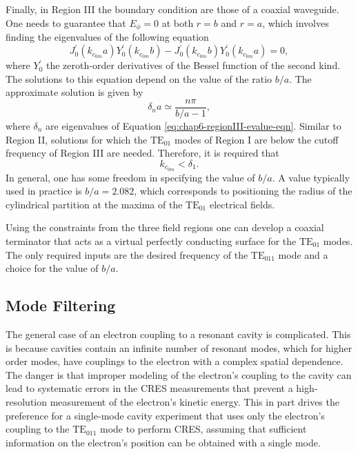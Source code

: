 Finally, in Region III the boundary condition are those of a coaxial waveguide. One needs to guarantee that $E_\phi = 0$ at both $r=b$ and $r=a$, which involves finding the eigenvalues of the following equation
\begin{equation}
    J^\prime_{0}(k_{c_{0m}}a)Y^\prime_0(k_{c_{0m}}b)-J^\prime_0(k_{c_{0m}}b)Y^\prime_0(k_{c_{0m}}a) = 0,
    \label{eq:chap6-regionIII-evalue-eqn}
\end{equation}
where $Y_0^\prime$ the zeroth-order derivatives of the Bessel function of the second kind. The solutions to this equation depend on the value of the ratio $b/a$. The approximate solution is given by 
\begin{equation}
    \delta_na\simeq\frac{n\pi}{b/a-1},  
\end{equation}
where $\delta_n$ are eigenvalues of Equation \ref{eq:chap6-regionIII-evalue-eqn}. Similar to Region II, solutions for which the $\mathrm{TE}_{01}$ modes of Region I are below the cutoff frequency of Region III are needed. Therefore, it is required that 
\begin{equation}
    k_{c_{0m}}<\delta_1.
\end{equation}
In general, one has some freedom in specifying the value of $b/a$. A value typically used in practice is $b/a=2.082$, which corresponds to positioning the radius of the cylindrical partition at the maxima of the $\mathrm{TE}_{01}$ electrical fields. 

Using the constraints from the three field regions one can develop a coaxial terminator that acts as a virtual perfectly conducting surface for the $\mathrm{TE}_{01}$ modes. The only required inputs are the desired frequency of the $\mathrm{TE}_{011}$ mode and a choice for the value of $b/a$. 

\subsection{Mode Filtering}
\label{sec:chap6-mode-filtering-techniques}

The general case of an electron coupling to a resonant cavity is complicated. This is because cavities contain an infinite number of resonant modes, which for higher order modes, have couplings to the electron with a complex spatial dependence. The danger is that improper modeling of the electron's coupling to the cavity can lead to systematic errors in the CRES measurements that prevent a high-resolution measurement of the electron's kinetic energy. This in part drives the preference for a single-mode cavity experiment that uses only the electron's coupling to the $\mathrm{TE}_{011}$ mode to perform CRES, assuming that sufficient information on the electron's position can be obtained with a single mode.

